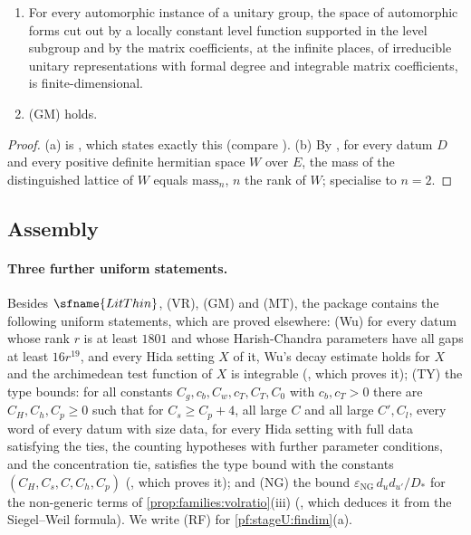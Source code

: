 \begin{lemma}\label{pf:stageU:findim}
\begin{enumerate}[label=(\alph*)]
\item For every automorphic instance of a unitary group, the space of automorphic forms cut out by a locally constant
level function supported in the level subgroup and by the matrix coefficients, at the infinite places, of irreducible
unitary representations with formal degree and integrable matrix coefficients, is finite-dimensional.
\item \textup{(GM)} holds.
\end{enumerate}
\end{lemma}

\begin{proof}
(a) is , which states exactly this (compare
\cite{HarishChandra1968}). (b) By , for every datum $D$ and every positive definite
hermitian space $W$ over $E$, the mass of the distinguished lattice of $W$ equals $\mathrm{mass}_n$, $n$ the rank of $W$;
specialise to $n=2$.
\end{proof}

\subsection{Assembly}\label{sec:pf:stageU:assembly}

\paragraph{Three further uniform statements.}
Besides $\sfname{LitThin}$, (VR), (GM) and (MT), the package contains the following uniform statements, which are proved
elsewhere: (Wu) for every datum whose rank $r$ is at least $1801$ and whose Harish-Chandra parameters have all gaps at least
$16r^{19}$, and every Hida setting $X$ of it, Wu's decay estimate holds for $X$ and the archimedean test function of $X$ is
integrable (, which proves it); (TY) the type bounds: for all constants
$C_g,c_b,C_w,c_T,C_T,C_0$ with $c_b,c_T>0$ there are $C_H,C_h,C_p\ge0$ such that for $C_s\ge C_p+4$, all large $C$ and all
large $C',C_l$, every word of every datum with size data, for every Hida setting with full data satisfying the ties, the
counting hypotheses with further parameter conditions, and the concentration tie, satisfies the type bound with the
constants $(C_H,C_s,C,C_h,C_p)$ (, which proves it); and (NG) the
bound $\varepsilon_{\mathrm{NG}}\,d_ud_{u'}/D_*$ for the non-generic terms of \cref{prop:families:volratio}(iii)
(, which deduces it from the Siegel--Weil formula). We write (RF) for
\cref{pf:stageU:findim}(a).

